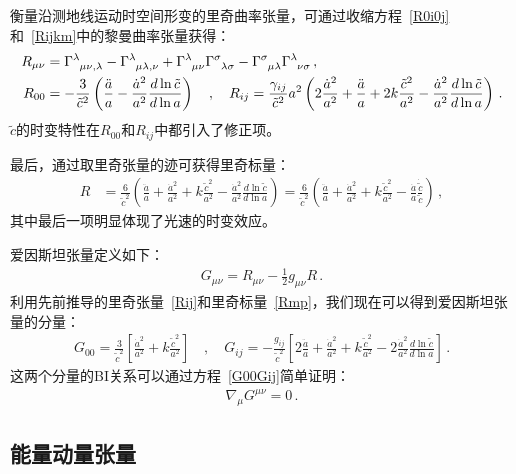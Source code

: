 \documentclass[jkps,preprint,fleqn]{revtex4}
\newcommand{\tc}{\tilde{c}}
\begin{document}
\begin{CJK*}{UTF8}{gbsn}
衡量沿测地线运动时空间形变的里奇曲率张量，可通过收缩方程~\eqref{R0i0j}和~\eqref{Rijkm}中的黎曼曲率张量获得：
\begin{align}
R_{\mu\nu} &= \tensor{\Gamma}{^\lambda_\mu_\nu_,_\lambda} - \tensor{\Gamma}{^\lambda_\mu_\lambda_,_\nu} + \tensor{\Gamma}{^\lambda_\mu_\nu} \tensor{\Gamma}{^\sigma_\lambda_\sigma} - \tensor{\Gamma}{^\sigma_\mu_\lambda} \tensor{\Gamma}{^\lambda_\nu_\sigma} \label{Rmn} \,, \\ R_{00} &= -\frac{3}{\tc^2} \left( \frac{\ddot{a}}{a} - \frac{\dot{a}^2}{a^2} \frac{d \ln \tc}{ d \ln a}  \right) \quad , \quad R_{ij} = \frac{\gamma_{ij}}{\tc^2} a^2 \left( 2 \frac{\dot{a}^2}{a^2} + \frac{\ddot{a}}{a} + 2 k \frac{\tc^2}{a^2} - \frac{\dot{a}^2}{a^2} \frac{d \ln \tc}{ d \ln a}  \right) \label{Rij} \,. \end{align}
$\tc$的时变特性在$R_{00}$和$R_{ij}$中都引入了修正项。

最后，通过取里奇张量的迹可获得里奇标量：
\begin{align} R &= \frac{6}{\tc^2} \left( \frac{\ddot{a}}{a} + \frac{\dot{a}^2}{a^2} + k \frac{\tc^2}{a^2} - \frac{\dot{a}^2}{a^2} \frac{d \ln \tc}{ d \ln a}  \right) =  \frac{6}{\tc^2} \left( \frac{\ddot{a}}{a} + \frac{\dot{a}^2}{a^2} + k \frac{\tc^2}{a^2} - \frac{\dot{a}}{a} \frac{\dot{\tc}}{\tc}  \right)  \label{Rmp} \,, \end{align}
其中最后一项明显体现了光速的时变效应。

爱因斯坦张量定义如下：
\begin{align}
G_{\mu\nu} = R_{\mu\nu} - \frac{1}{2} g_{\mu\nu} R \label{Gmunu} \,.
\end{align}
利用先前推导的里奇张量~\eqref{Rij}和里奇标量~\eqref{Rmp}，我们现在可以得到爱因斯坦张量的分量：
\begin{align}
G_{00} = \frac{3}{\tc^2} \left[ \frac{\dot{a}^2}{a^2} + k \frac{\tc^2}{a^2} \right] \quad , \quad G_{ij} = -\frac{g_{ij}}{\tc^2} \left[ 2 \frac{\ddot{a}}{a} + \frac{\dot{a}^2}{a^2} + k \frac{\tc^2}{a^2} - 2 \frac{\dot{a}^2}{a^2} \frac{d \ln \tc}{d \ln a} \right] \,. \label{G00Gij}
\end{align}
这两个分量的BI关系可以通过方程~\eqref{G00Gij}简单证明：
\begin{align}
\nabla_{\mu} G^{\mu \nu} = 0 \label{nablaGmunu} \,.
\end{align}
\subsection{能量动量张量}\label{subsec:Tmunu}


\end{CJK*}
\end{document}
